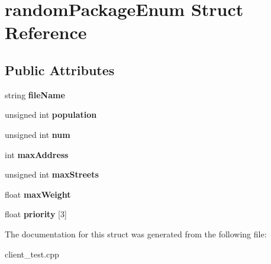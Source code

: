 \hypertarget{structrandomPackageEnum}{}\section{random\+Package\+Enum Struct Reference}
\label{structrandomPackageEnum}
\subsection*{Public Attributes}
\begin{DoxyCompactItemize}
\item 
string {\bfseries file\+Name}\hypertarget{structrandomPackageEnum_a7dad87a12d867dd8bb04f5581be763e2}{}\label{structrandomPackageEnum_a7dad87a12d867dd8bb04f5581be763e2}

\item 
unsigned int {\bfseries population}\hypertarget{structrandomPackageEnum_a5940d060e49b74000668197d8d16b0a3}{}\label{structrandomPackageEnum_a5940d060e49b74000668197d8d16b0a3}

\item 
unsigned int {\bfseries num}\hypertarget{structrandomPackageEnum_a5a7ec08d66b02b75d4a5129af96f2b49}{}\label{structrandomPackageEnum_a5a7ec08d66b02b75d4a5129af96f2b49}

\item 
int {\bfseries max\+Address}\hypertarget{structrandomPackageEnum_a46542ae8e5573318f29d4e98fc1a0729}{}\label{structrandomPackageEnum_a46542ae8e5573318f29d4e98fc1a0729}

\item 
unsigned int {\bfseries max\+Streets}\hypertarget{structrandomPackageEnum_abadf8113dccc0b04095cda2a7720452f}{}\label{structrandomPackageEnum_abadf8113dccc0b04095cda2a7720452f}

\item 
float {\bfseries max\+Weight}\hypertarget{structrandomPackageEnum_a5f00484f08fe876f13610b173c8ffda4}{}\label{structrandomPackageEnum_a5f00484f08fe876f13610b173c8ffda4}

\item 
float {\bfseries priority} \mbox{[}3\mbox{]}\hypertarget{structrandomPackageEnum_aaecc934571415a461266beeaea241f2a}{}\label{structrandomPackageEnum_aaecc934571415a461266beeaea241f2a}

\end{DoxyCompactItemize}


The documentation for this struct was generated from the following file\+:\begin{DoxyCompactItemize}
\item 
client\+\_\+test.\+cpp\end{DoxyCompactItemize}

